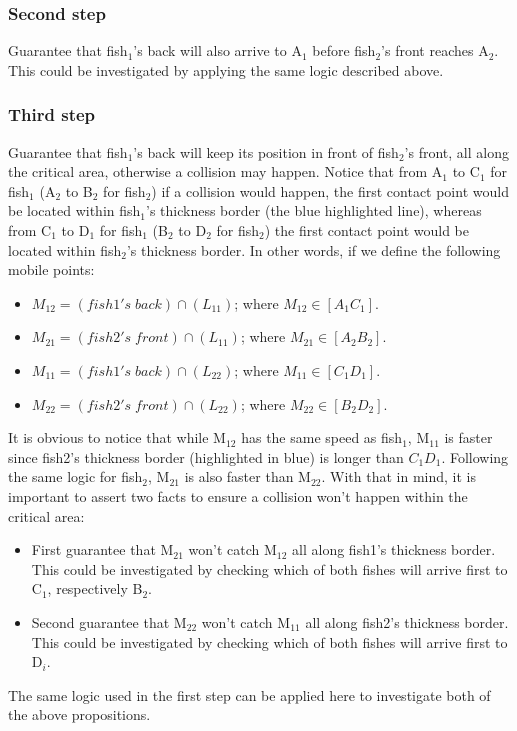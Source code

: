 \subsubsection{Second step}
Guarantee that fish$_1$'s back will also arrive to A$_1$ before fish$_2$'s front reaches A$_2$. This could be investigated by applying the same logic described above.

\subsubsection{Third step}
Guarantee that fish$_1$'s back will keep its position in front of fish$_2$'s front, all along the critical area, otherwise a collision may happen. Notice that from A$_1$ to C$_1$ for fish$_1$ (A$_2$ to B$_2$ for fish$_2$) if a collision would happen, the first contact point would be located within fish$_1$'s thickness border (the blue highlighted line), whereas from C$_1$ to D$_1$ for fish$_1$ (B$_2$ to D$_2$ for fish$_2$) the first contact point would be located within fish$_2$'s thickness border. In other words, if we define the following mobile points:

\begin{itemize}
\item $M_{12} = (fish1's\; back) \cap (L_{11})$; where $M_{12} \in [A_1C_1]$.
\item $M_{21} = (fish2's\; front) \cap (L_{11})$; where $M_{21}  \in [A_2B_2]$.
\item $M_{11} = (fish1's\; back) \cap (L_{22})$; where $M_{11}  \in [C_1D_1]$.
\item $M_{22} = (fish2's\; front) \cap (L_{22})$; where $M_{22}  \in [B_2D_2]$.
\end{itemize}

It is obvious to notice that while M$_{12}$ has the same speed as fish$_1$, M$_{11}$ is faster since fish2's thickness border (highlighted in blue) is longer than $C_1D_1$. Following the same logic for fish$_2$, M$_{21}$ is also faster than M$_{22}$. With that in mind, it is important to assert two facts to ensure a collision won't happen within the critical area:

\begin{itemize}
\item First guarantee that M$_{21}$ won't catch M$_{12}$ all along fish1's thickness border. This could be investigated by checking which of both fishes will arrive first to C$_1$, respectively B$_2$.
\item Second guarantee that M$_{22}$ won't catch M$_{11}$ all along fish2's thickness border. This could be investigated by checking which of both fishes will arrive first to D$_i$.
\end{itemize}

The same logic used in the first step can be applied here to investigate both of the above propositions.

\newpage